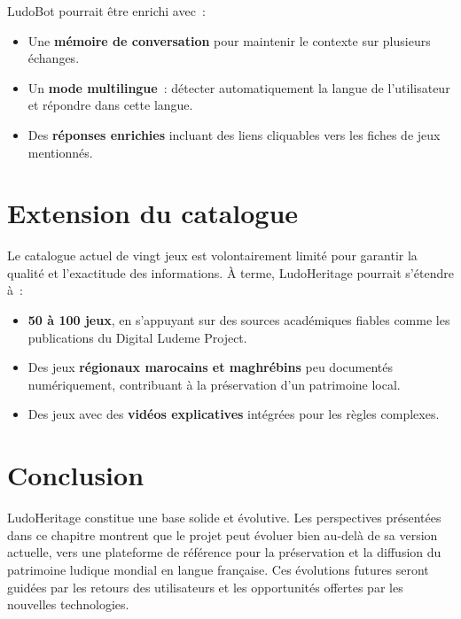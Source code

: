 LudoBot pourrait être enrichi avec~:
\begin{itemize}
    \item Une \textbf{mémoire de conversation} pour maintenir le contexte sur plusieurs échanges.
    \item Un \textbf{mode multilingue}~: détecter automatiquement la langue de l'utilisateur
          et répondre dans cette langue.
    \item Des \textbf{réponses enrichies} incluant des liens cliquables vers les fiches de jeux
          mentionnés.
\end{itemize}

\section{Extension du catalogue}

Le catalogue actuel de vingt jeux est volontairement limité pour garantir la qualité et
l'exactitude des informations. À terme, LudoHeritage pourrait s'étendre à~:

\begin{itemize}
    \item \textbf{50 à 100 jeux}, en s'appuyant sur des sources académiques fiables comme
          les publications du Digital Ludeme Project.
    \item Des jeux \textbf{régionaux marocains et maghrébins} peu documentés numériquement,
          contribuant à la préservation d'un patrimoine local.
    \item Des jeux avec des \textbf{vidéos explicatives} intégrées pour les règles complexes.
\end{itemize}

\section{Conclusion}

LudoHeritage constitue une base solide et évolutive. Les perspectives présentées dans ce
chapitre montrent que le projet peut évoluer bien au-delà de sa version actuelle, vers une
plateforme de référence pour la préservation et la diffusion du patrimoine ludique mondial
en langue française. Ces évolutions futures seront guidées par les retours des utilisateurs
et les opportunités offertes par les nouvelles technologies.
